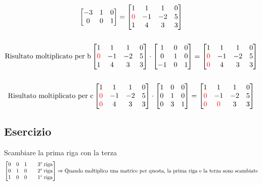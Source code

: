 \documentclass[italian]{article}
\begin{document}
\begin{gather*}
\begin{bmatrix}
		-3 & 1 & 0 \\
		0 & 0 & 1
	\end{bmatrix}
	=
	\begin{bmatrix}
		1 & 1 & 1 & 0 \\
		\textcolor{red}{0} & -1 & -2 & 5 \\
		1 & 4 & 3 & 3
	\end{bmatrix}
	\\\\
	\text{Risultato moltiplicato per b}
	\begin{bmatrix}
		1 & 1 & 1 & 0 \\
		\textcolor{red}{0} & -1 & -2 & 5 \\
		1 & 4 & 3 & 3
	\end{bmatrix}
	\cdot
	\begin{bmatrix}
		1 & 0 & 0 \\
		0 & 1 & 0 \\
		-1 & 0 & 1
	\end{bmatrix}
	=
	\begin{bmatrix}
		1 & 1 & 1 & 0 \\
		\textcolor{red}{0} & -1 & -2 & 5 \\
		\textcolor{red}{0} & 4 & 3 & 3
	\end{bmatrix}
	\\\\
	\text{Risultato moltiplicato per c}
	\begin{bmatrix}
		1 & 1 & 1 & 0 \\
		\textcolor{red}{0} & -1 & -2 & 5 \\
		\textcolor{red}{0} & 4 & 3 & 3
	\end{bmatrix}
	\cdot
	\begin{bmatrix}
		1 & 0 & 0 \\
		0 & 1 & 0 \\
		0 & 3 & 1
	\end{bmatrix}
	=
	\begin{bmatrix}
	1 & 1 & 1 & 0 \\
	\textcolor{red}{0} & -1 & -2 & 5 \\
	\textcolor{red}{0} & \textcolor{red}{0} & 3 & 3
	\end{bmatrix}
\end{gather*}

\pagebreak
\subsection{Esercizio} Scambiare la prima riga con la terza
\begin{gather*}
	\begin{bmatrix}
		0 & 0 & 1 \qquad \text{3\textdegree \;riga}\\
		0 & 1 & 0 \qquad \text{2\textdegree \;riga}\\
		1 & 0 & 0 \qquad \text{1\textdegree \;riga}
	\end{bmatrix}
	\Rightarrow 
	\text{Quando moltiplico una matrice per questa, la prima riga e la terza sono scambiate}
\end{gather*}
\end{document}

